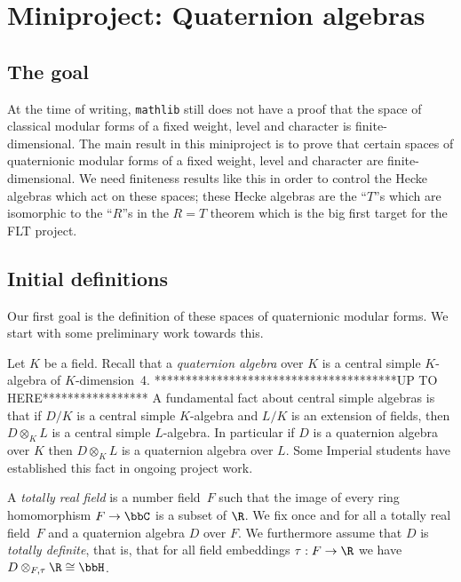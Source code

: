 \chapter{Miniproject: Quaternion algebras}\label{Quat_alg_project}

\section{The goal}

At the time of writing, {\tt mathlib} still does not have a proof that the space
of classical modular forms of a fixed weight, level and character is finite-dimensional.
The main result in this miniproject is to prove that certain spaces of quaternionic modular forms
of a fixed weight, level and character are finite-dimensional. We need finiteness results
like this in order to control the Hecke algebras which act on these spaces; these Hecke
algebras are the ``$T$''s which are isomorphic to the ``$R$''s in the $R=T$ theorem which
is the big first target for the FLT project.

\section{Initial definitions}

Our first goal is the definition of these spaces of quaternionic modular forms. We start with
some preliminary work towards this.

Let $K$ be a field. Recall that a \emph{quaternion algebra}
over $K$ is a central simple $K$-algebra of $K$-dimension~4.
***************************************UP TO HERE*****************\grlse
A fundamental fact about central simple algebras is that if $D/K$
is a central simple $K$-algebra and $L/K$ is an extension of fields, then $D\otimes_KL$
is a central simple $L$-algebra. In particular if $D$ is a quaternion algebra over $K$
then $D\otimes_KL$ is a quaternion algebra over $L$. Some Imperial students have established
this fact in ongoing project work.

A \emph{totally real field} is a number field~$F$ such that the image of every ring
homomorphism $F\to\bbC$ is a subset of $\R$. We fix once and for all a totally real field~$F$ and a
quaternion algebra $D$ over $F$. We furthermore assume that $D$ is \emph{totally definite}, that is,
that for all field embeddings $\tau:F\to\R$ we have $D\otimes_{F,\tau}\R\cong\bbH$.

